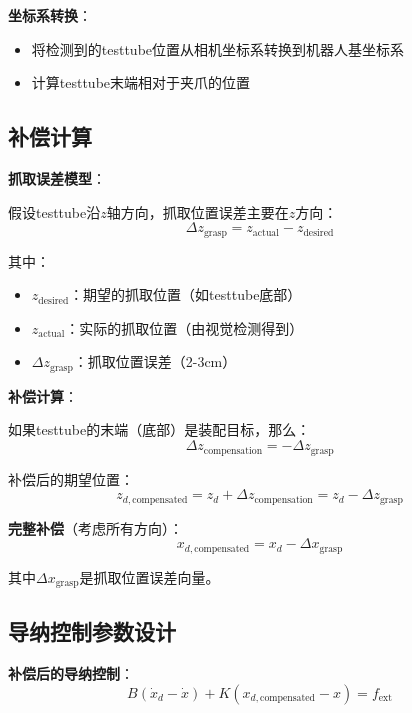 \documentclass[12pt,a4paper]{article}
\begin{document}
\textbf{坐标系转换}：
\begin{itemize}
\item 将检测到的testtube位置从相机坐标系转换到机器人基坐标系
\item 计算testtube末端相对于夹爪的位置
\end{itemize}

\subsection{补偿计算}

\textbf{抓取误差模型}：

假设testtube沿$z$轴方向，抓取位置误差主要在$z$方向：
\begin{equation}
\Delta z_{\text{grasp}} = z_{\text{actual}} - z_{\text{desired}}
\end{equation}

其中：
\begin{itemize}
\item $z_{\text{desired}}$：期望的抓取位置（如testtube底部）
\item $z_{\text{actual}}$：实际的抓取位置（由视觉检测得到）
\item $\Delta z_{\text{grasp}}$：抓取位置误差（2-3cm）
\end{itemize}

\textbf{补偿计算}：

如果testtube的末端（底部）是装配目标，那么：
\begin{equation}
\Delta z_{\text{compensation}} = -\Delta z_{\text{grasp}}
\end{equation}

补偿后的期望位置：
\begin{equation}
z_{d,\text{compensated}} = z_d + \Delta z_{\text{compensation}} = z_d - \Delta z_{\text{grasp}}
\end{equation}

\textbf{完整补偿}（考虑所有方向）：
\begin{equation}
x_{d,\text{compensated}} = x_d - \Delta x_{\text{grasp}}
\end{equation}

其中$\Delta x_{\text{grasp}}$是抓取位置误差向量。

\subsection{导纳控制参数设计}

\textbf{补偿后的导纳控制}：
\begin{equation}
B(\dot{x}_d - \dot{x}) + K(x_{d,\text{compensated}} - x) = f_{\text{ext}}
\end{equation}
\end{document}

